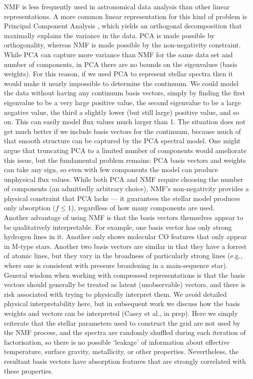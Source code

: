 \documentclass[modern,linenumbers]{aastex631}
\renewcommand{\added}[1]{#1}
\newcommand{\removed}[1]{}
\begin{document}
NMF is less frequently used in astronomical data analysis than other linear representations. A more common linear representation for this kind of problem is Principal Component Analysis \citep[PCA;][]{pca}, which yields an orthogonal decomposition that maximally explains the variance in the data. PCA is made possible by orthogonality, whereas NMF is made possible by the non-negativity constraint. While PCA can capture more variance than NMF for the same data set and number of components, in PCA there are no bounds on the eigenvalues (basis weights). For this reason, if we used PCA to represent stellar spectra then it would make it nearly impossible to determine the continuum. We could model the data without having any continuum basis vectors, simply by finding the first eigenvalue to be a very large positive value, the second eigenvalue to be a large negative value, the third a slightly lower (but still large) positive value, and so on. This can easily model flux values much larger than 1. The situation does not get much better if we include basis vectors for the continuum, because much of that smooth structure can be captured by the PCA spectral model. \added{One might argue that truncating PCA to a limited number of components would ameliorate this issue, but the fundamental problem remains: PCA basis vectors and weights can take any sign, so even with few components the model can produce unphysical flux values. While both PCA and NMF require choosing the number of components (an admittedly arbitrary choice), NMF's non-negativity provides a physical constraint that PCA lacks --- it guarantees the stellar model produces only absorption ($f \leq 1$), regardless of how many components are used.}\\

Another \removed{somewhat unexpected} advantage of using NMF is that the basis vectors themselves appear to be \added{qualitatively} \removed{highly} interpretable. For example, one basis vector has only strong hydrogen lines in it. Another only shows molecular CO features that only appear in M-type stars. Another two basis vectors are similar in that they have a forrest of atomic lines, but they vary in the broadness of particularly strong lines (e.g., where one is consistent with pressure broadening in a main-sequence star). General wisdom when working with compressed representations is that the basis vectors should generally be treated as latent (unobservable) vectors, and there is risk associated with trying to physically interpret them. We avoid \added{detailed} physical interpretability here, but in subsequent work we discuss how the basis weights and vectors can be interpreted (Casey et al., in prep). Here we simply reiterate that the stellar parameters used to construct the grid are not used by the NMF process, and the spectra are randomly shuffled during each iteration of factorisation, so there is no possible `leakage' of information about effective temperature, surface gravity, metallicity, or other properties. Nevertheless, the resultant basis vectors have absorption features that are strongly correlated with these properties. \\
\end{document}
